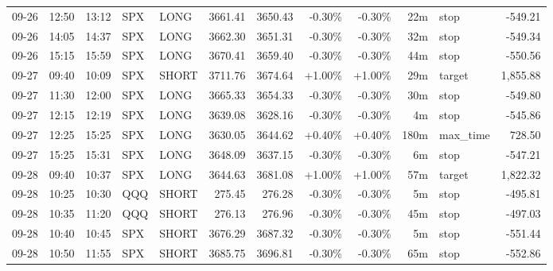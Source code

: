 \documentclass[11pt,a4paper,twoside]{article}
\begin{document}
\begin{center}
\begin{longtable}{>{\color{txtmain}}l l l l l r r r r r >{\color{txtmain}}l r}
09-26 & 12:50 & 13:12 & SPX & LONG & 3661.41 & 3650.43 & \textcolor{lossred}{-0.30\%} & \textcolor{lossred}{-0.30\%} & 22m & stop & \textcolor{lossred}{-549.21} \\
09-26 & 14:05 & 14:37 & SPX & LONG & 3662.30 & 3651.31 & \textcolor{lossred}{-0.30\%} & \textcolor{lossred}{-0.30\%} & 32m & stop & \textcolor{lossred}{-549.34} \\
09-26 & 15:15 & 15:59 & SPX & LONG & 3670.41 & 3659.40 & \textcolor{lossred}{-0.30\%} & \textcolor{lossred}{-0.30\%} & 44m & stop & \textcolor{lossred}{-550.56} \\
09-27 & 09:40 & 10:09 & SPX & SHORT & 3711.76 & 3674.64 & \textcolor{wingreen}{+1.00\%} & \textcolor{wingreen}{+1.00\%} & 29m & target & \textcolor{wingreen}{1,855.88} \\
09-27 & 11:30 & 12:00 & SPX & LONG & 3665.33 & 3654.33 & \textcolor{lossred}{-0.30\%} & \textcolor{lossred}{-0.30\%} & 30m & stop & \textcolor{lossred}{-549.80} \\
09-27 & 12:15 & 12:19 & SPX & LONG & 3639.08 & 3628.16 & \textcolor{lossred}{-0.30\%} & \textcolor{lossred}{-0.30\%} & 4m & stop & \textcolor{lossred}{-545.86} \\
09-27 & 12:25 & 15:25 & SPX & LONG & 3630.05 & 3644.62 & \textcolor{wingreen}{+0.40\%} & \textcolor{wingreen}{+0.40\%} & 180m & max\_time & \textcolor{wingreen}{728.50} \\
09-27 & 15:25 & 15:31 & SPX & LONG & 3648.09 & 3637.15 & \textcolor{lossred}{-0.30\%} & \textcolor{lossred}{-0.30\%} & 6m & stop & \textcolor{lossred}{-547.21} \\
09-28 & 09:40 & 10:37 & SPX & LONG & 3644.63 & 3681.08 & \textcolor{wingreen}{+1.00\%} & \textcolor{wingreen}{+1.00\%} & 57m & target & \textcolor{wingreen}{1,822.32} \\
09-28 & 10:25 & 10:30 & QQQ & SHORT & 275.45 & 276.28 & \textcolor{lossred}{-0.30\%} & \textcolor{lossred}{-0.30\%} & 5m & stop & \textcolor{lossred}{-495.81} \\
09-28 & 10:35 & 11:20 & QQQ & SHORT & 276.13 & 276.96 & \textcolor{lossred}{-0.30\%} & \textcolor{lossred}{-0.30\%} & 45m & stop & \textcolor{lossred}{-497.03} \\
09-28 & 10:40 & 10:45 & SPX & SHORT & 3676.29 & 3687.32 & \textcolor{lossred}{-0.30\%} & \textcolor{lossred}{-0.30\%} & 5m & stop & \textcolor{lossred}{-551.44} \\
09-28 & 10:50 & 11:55 & SPX & SHORT & 3685.75 & 3696.81 & \textcolor{lossred}{-0.30\%} & \textcolor{lossred}{-0.30\%} & 65m & stop & \textcolor{lossred}{-552.86} \\

\end{longtable}
\end{center}
\end{document}
